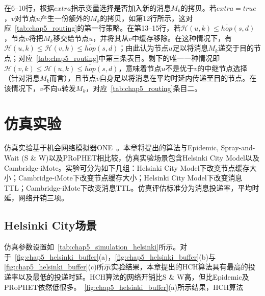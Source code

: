 在6--10行，根据$extra$指示变量选择是否加入新的消息$M_k$的拷贝。若$extra=true$，$v$对节点$u$产生一份额外的$M_k$的拷贝，如第12行所示，这对应\tablename~\ref{tab:chap5_routing}的第一行策略。在第13--15行，若$\mathcal{H}(u,k)\leq\overline{hop}(s,d)$，节点$v$将把$M_k$移交给节点$u$，并将其从$v$中缓存移除。在这种情况下，有$\mathcal{H}(u,k)\leq\mathcal{H}(v,k)\leq\overline{hop}(s,d)$；由此认为节点$u$足以将消息$M_k$递交于目的节点；对应\tablename~\ref{tab:chap5_routing}中第三条表目。剩下的唯一一种情况即$\mathcal{H}(v,k)\leq\mathcal{H}(u,k)\leq\overline{hop}(s,d)$，意味着节点$u$不是优于$v$的中继节点选择（针对消息$M_k$而言），且节点$v$自身足以将消息在平均时延内传递至目的节点。在该情况下，$v$不向$u$转发$M_k$，对应\tablename~\ref{tab:chap5_routing}条目二。

\section{仿真实验}
\label{chap5:仿真实验}

仿真实验基于机会网络模拟器ONE~\cite{Keranen2009}。本章将提出的算法与Epidemic, Spray-and-Wait (S \& W)以及PRoPHET相比较，仿真实验场景包含Helsinki City Model以及Cambridge-iMote。实验可分为如下几组：Helsinki City Model下改变节点缓存大小；Cambridge-iMote下改变节点缓存大小；Helsinki City Model下改变消息TTL；Cambridge-iMote下改变消息TTL。仿真评估标准分为消息投递率，平均时延，网络开销三项。

\subsection{Helsinki City场景}

仿真参数设置如\tablename~\ref{tab:chap5_simulation_helsinki}所示。对于\figurename~\ref{fig:chap5_helsinki_buffer}(a)，\ref{fig:chap5_helsinki_buffer}(b)与\ref{fig:chap5_helsinki_buffer}(c)所示实验结果，本章提出的HCH算法具有最高的投递率以及最低的投递时延。HCH算法的网络开销比S \& W高，但比Epidemic及PRoPHET依然低很多。\figurename~\ref{fig:chap5_helsinki_buffer}(a)所示结果，HCH算法

